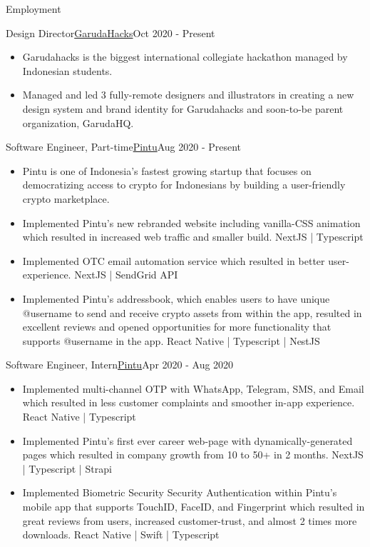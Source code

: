 \documentclass[]{mcdowellcv}
\begin{document}
	\begin{cvsection}{Employment}
		\begin{cvsubsection}{Design Director}{\href{https://garudahacks.com/}{GarudaHacks}}{Oct 2020 - Present}
			\begin{itemize}
				\item Garudahacks is the biggest international collegiate hackathon managed by Indonesian students.
				\item Managed and led 3 fully-remote designers and illustrators in creating a new design system and brand identity for Garudahacks and soon-to-be parent organization, GarudaHQ.
			\end{itemize}
		\end{cvsubsection}

		\begin{cvsubsection}{Software Engineer, Part-time}{\href{https://pintu.co.id/}{Pintu}}{Aug 2020 - Present}
			\begin{itemize}
				\item Pintu is one of Indonesia's fastest growing startup that focuses on democratizing access to crypto for Indonesians by building a user-friendly crypto marketplace.
				\item Implemented Pintu's new rebranded website including vanilla-CSS animation which resulted in increased web traffic and smaller build. NextJS | Typescript
				\item Implemented OTC email automation service which resulted in better user-experience. NextJS | SendGrid API
				\item Implemented Pintu's addressbook, which enables users to have unique @username to send and receive crypto assets from within the app, resulted in excellent reviews and opened opportunities for more functionality that supports @username in the app. React Native | Typescript | NestJS
			\end{itemize}
		\end{cvsubsection}
		
		
		\begin{cvsubsection}{Software Engineer, Intern}{\href{https://pintu.co.id/}{Pintu}}{Apr 2020 - Aug 2020}
			\begin{itemize}
				\item Implemented multi-channel OTP with WhatsApp, Telegram, SMS, and Email which resulted in less customer complaints and smoother in-app experience. React Native | Typescript
				\item Implemented Pintu's first ever career web-page with dynamically-generated pages which resulted in company growth from 10 to 50+ in 2 months. NextJS | Typescript | Strapi
				\item Implemented Biometric Security Security Authentication within Pintu's mobile app that supports TouchID, FaceID, and Fingerprint which resulted in great reviews from users, increased customer-trust, and almost 2 times more downloads. React Native | Swift | Typescript
			\end{itemize}
		\end{cvsubsection}


\end{cvsection}
\end{document}
